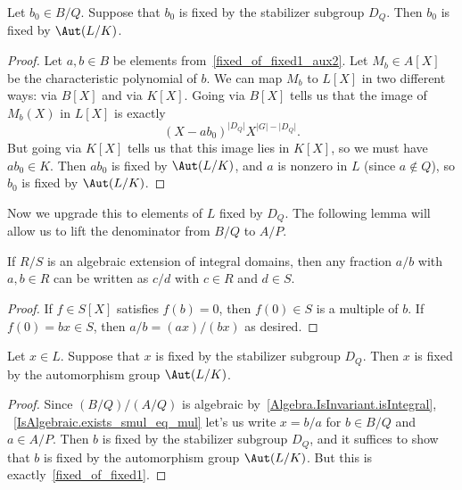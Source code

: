 \begin{proposition}
  \label{fixed_of_fixed1}
  \mathlibok
  Let $b_0 \in B/Q$.
  Suppose that $b_0$ is fixed by the stabilizer subgroup $D_Q$.
  Then $b_0$ is fixed by $\Aut(L/K)$.
\end{proposition}
\begin{proof}
  Let $a,b\in B$ be elements from~\ref{fixed_of_fixed1_aux2}.
  Let $M_b \in A[X]$ be the characteristic polynomial of $b$.
  We can map $M_b$ to $L[X]$ in two different ways: via $B[X]$ and via $K[X]$.
  Going via $B[X]$ tells us that the image of $M_b(X)$ in $L[X]$ is exactly
  $$(X - ab_0)^{\lvert D_Q\rvert}X^{\lvert G\rvert-\lvert D_Q\rvert}.$$
  But going via $K[X]$ tells us that this image lies in $K[X]$, so we must have $ab_0\in K$.
  Then $ab_0$ is fixed by $\Aut(L/K)$, and $a$ is nonzero in $L$ (since $a\notin Q$),
  so $b_0$ is fixed by $\Aut(L/K)$.
  \mathlibok
\end{proof}

Now we upgrade this to elements of $L$ fixed by $D_Q$.
The following lemma will allow us to lift the denominator from $B/Q$ to $A/P$.

\begin{lemma}
  \label{IsAlgebraic.exists_smul_eq_mul}
  \mathlibok
  If $R/S$ is an algebraic extension of integral domains, then any fraction $a/b$ with $a,b\in R$
  can be written as $c/d$ with $c\in R$ and $d\in S$.
\end{lemma}
\begin{proof}
  If $f\in S[X]$ satisfies $f(b)=0$, then $f(0)\in S$ is a multiple of $b$.
  If $f(0)=bx\in S$, then $a/b=(ax)/(bx)$ as desired.
  \mathlibok
\end{proof}

\begin{proposition}
  \label{fixed_of_fixed2}
  \mathlibok
  Let $x \in L$.
  Suppose that $x$ is fixed by the stabilizer subgroup $D_Q$.
  Then $x$ is fixed by the automorphism group $\Aut(L/K)$.
\end{proposition}
\begin{proof}
  Since $(B/Q)/(A/Q)$ is algebraic by~\ref{Algebra.IsInvariant.isIntegral},
  ~\ref{IsAlgebraic.exists_smul_eq_mul} let's us write $x=b/a$ for $b \in B/Q$ and $a \in A/P$.
  Then $b$ is fixed by the stabilizer subgroup $D_Q$, and it suffices to show that
  $b$ is fixed by the automorphism group $\Aut(L/K)$.
  But this is exactly~\ref{fixed_of_fixed1}.
  \mathlibok
\end{proof}

